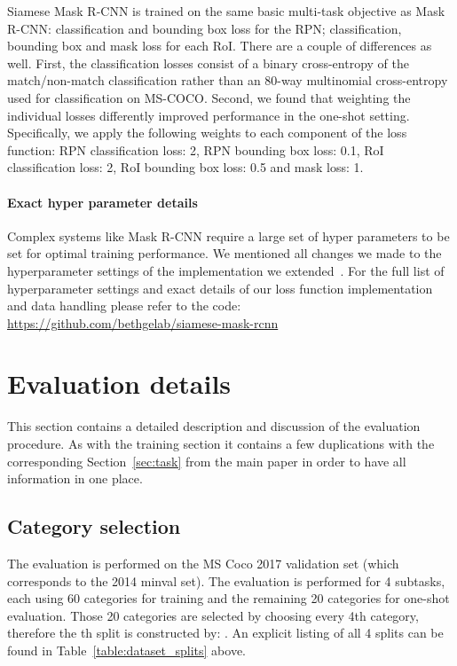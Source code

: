 \documentclass{article}
\newcommand{\coco}{MS-COCO\xspace}
\begin{document}
Siamese Mask R-CNN is trained on the same basic multi-task objective as Mask R-CNN: classification and bounding box loss for the RPN; classification, bounding box and mask loss for each RoI. There are a couple of differences as well. First, the classification losses consist of a binary cross-entropy of the match/non-match classification rather than an 80-way multinomial cross-entropy used for classification on \coco. Second, we found that weighting the individual losses differently improved performance in the one-shot setting. Specifically, we apply the following weights to each component of the loss function: RPN classification loss: 2, RPN bounding box loss: 0.1, RoI classification loss: 2, RoI bounding box loss: 0.5 and mask loss: 1.




\paragraph{Exact hyper parameter details}
Complex systems like Mask R-CNN require a large set of hyper parameters to be set for optimal training performance. We mentioned all changes we made to the hyperparameter settings of the implementation we extended~\cite{Abdulla2017}. For the full list of hyperparameter settings and exact details of our loss function implementation and data handling please refer to the code: \url{https://github.com/bethgelab/siamese-mask-rcnn} 



\section{Evaluation details}
\label{appendix:evaluation}

This section contains a detailed description and discussion of the evaluation procedure. As with the training section it contains a few duplications with the corresponding Section~\ref{sec:task} from the main paper in order to have all information in one place.

\subsection{Category selection}
The evaluation is performed on the MS Coco 2017 validation set (which corresponds to the 2014 minval set). The evaluation is performed for 4 subtasks, each using 60 categories for training and the remaining 20 categories for one-shot evaluation. Those 20 categories are selected by choosing every 4th category, therefore the th split is constructed by: . An explicit listing of all 4 splits can be found in Table~\ref{table:dataset_splits} above.
\end{document}

